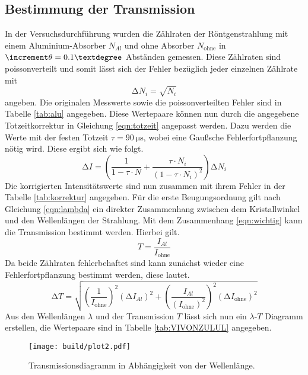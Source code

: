 \subsection{Bestimmung der Transmission}
In der Versuchsdurchführung wurden die Zählraten der Röntgenstrahlung mit einem Aluminium-Absorber $N_{Al}$ und ohne Absorber $N_{\text{ohne}}$ in $\increment \theta= 0.1\textdegree$ Abständen gemessen.
Diese Zählraten sind poissonverteilt und somit lässt sich der Fehler bezüglich jeder einzelnen Zählrate mit
\begin{equation*}
\increment N_{i} = \sqrt{N_{i}}
\end{equation*}
angeben. Die originalen Messwerte sowie die poissonverteilten Fehler sind in Tabelle \ref{tab:alu} angegeben. Diese Wertepaare können nun durch die angegebene Totzeitkorrektur in Gleichung \eqref{eqn:totzeit}
angepasst werden. Dazu werden die Werte mit der festen Totzeit $\tau = \SI{90}{\micro\second}$, wobei eine Gaußsche Fehlerfortpflanzung nötig wird. Diese ergibt sich wie folgt.
\begin{equation}
\increment I = \left( \frac{1}{1 - \tau \cdot N} + \frac{\tau \cdot N_{i}}{(1 - \tau \cdot N_{i})^{2}} \right) \increment N_{i}
\end{equation}
Die korrigierten Intensitätswerte sind nun zusammen mit ihrem Fehler in der Tabelle \ref{tab:korrektur} angegeben.
Für die erste Beugungsordnung gilt nach Gleichung \ref{eqn:lambda} ein direkter Zusammenhang zwischen dem Kristallwinkel und den Wellenlängen der Strahlung.
Mit dem Zusammenhang \eqref{eqn:wichtig} kann die Transmission bestimmt werden. Hierbei gilt.
\begin{equation*}
T = \frac{I_{Al}}{I_{\text{ohne}}}
\end{equation*}
Da beide Zählraten fehlerbehaftet sind kann zunächst wieder eine Fehlerfortpflanzung bestimmt werden, diese lautet.
\begin{equation}
\increment T = \sqrt{\left( \frac{1}{I_{\text{ohne}}}\right)^{2} (\increment I_{Al})^{2} + \left( \frac{I_{Al}}{(I_{\text{ohne}})^{2}}\right)^{2} (\increment I_{\text{ohne}})^{2}}
\end{equation}
Aus den Wellenlängen $\lambda$ und der Transmission $T$ lässt sich nun ein $\lambda$-$T$ Diagramm erstellen, die Wertepaare sind in Tabelle \ref{tab:VIVONZULUL} angegeben.

\begin{figure}[h]
  \centering
  \texttt{[image: build/plot2.pdf]}
  \caption{Transmissionsdiagramm in Abhängigkeit von der Wellenlänge.}
  \label{fig:plot2}
\end{figure}

